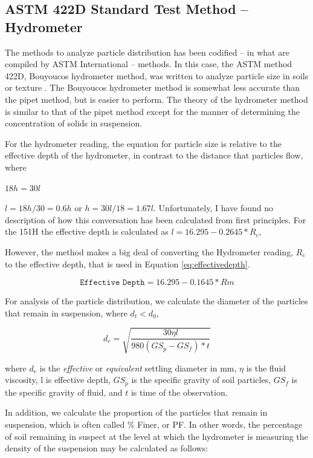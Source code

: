 \documentclass{tufte-handout}
\begin{document}
\subsection{ASTM 422D Standard Test Method -- Hydrometer}

The methods to analyze particle distribution has been codified -- in what are compiled by ASTM International -- methods. In this case, the ASTM method 422D, Bouyoucos hydrometer method, was written to analyze particle size in soils or texture \citep{standard2007d422}. The Bouyoucos hydrometer method is somewhat less accurate than the pipet method, but is easier to perform.  The theory of the hydrometer method is similar to that of the pipet method except for the manner of determining the concentration of solids in suspension.  

For the hydrometer reading, the equation for particle size is relative to the effective depth of the hydrometer, in contrast to the distance that particles flow, where

$18 h = 30 l$

$l = 18h/30 = 0.6h$ or $h = 30l/18 = 1.67l$. Unfortunately, I have found no description of how this conversation has been calculated from first principles. For the 151H the effective depth is calculated as $l = 16.295 - 0.2645* R_c$,

However, the method makes a big deal of converting the Hydrometer reading, $R_c$ to the effective depth, that is used in Equation \ref{eq:effectivedepth}.

\begin{equation}\label{eq:effectivedepth}
\texttt{Effective Depth} = 16.295 - 0.1645*Rm
\end{equation}

For analysis of the particle distribution, we calculate the diameter of the particles that remain in suspension, where $d_t < d_0$,  

\begin{equation}
d_e = \sqrt{\frac{30 \eta l}{980 (GS_p - GS_f)* t}}
\end{equation}

\noindent where $d_e$ is the \emph{effective} or \emph{equivalent} settling diameter in mm, 
$\eta$ is the fluid viscosity,
l is effective depth,
$GS_p$ is the specific gravity of soil particles,
$GS_f$ is the specific gravity of fluid, and
$t$ is time of the observation.

In addition, we calculate the proportion of the particles that remain in suspension, which is often called \% Finer, or PF. In other words, the percentage of soil remaining in suspect at the level at which the hydrometer is measuring the density of the suspension may be calculated as follows:
\end{document}
